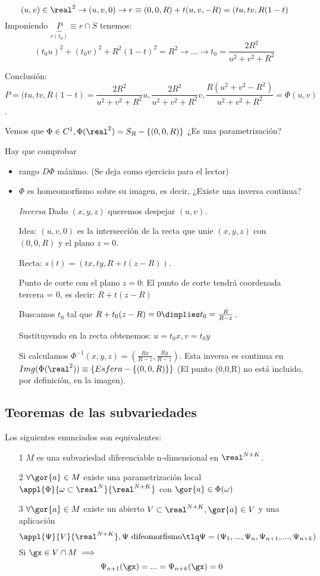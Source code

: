  \[(u,v) \in \real^2 \rightarrow (u,v,0) \rightarrow r\equiv (0,0,R) + t(u,v,-R) = (tu,tv,R(1-t)\]
 Imponiendo $\underbrace{P}_{r(t_0)} \equiv r\cap S$ tenemos: \[(t_0u)^2+(t_0v)^2 + R^2(1-t)^2 = R^2 \rightarrow ... \rightarrow t_0 = \frac{2R^2}{u^2+v^2+R^2}\]
 
 Conclusión: \[P = (tu,tv,R(1-t) = \frac{2R^2}{u^2+v^2+R^2}u,\frac{2R^2}{u^2+v^2+R^2}v,\frac{R(u^2+v^2-R^2)}{u^2+v^2+R^2} = \Phi(u,v)\].
 
 Vemos que $\Phi\in C^1, \Phi(\real^2) = S_R-\{(0,0,R)\}$ ¿Es una parametrización?
 
 Hay que comprobar \begin{itemize}
 \item rango $D\Phi$ máximo. (Se deja como ejercicio para el lector)
 \item $\Phi$ es homeomorfismo sobre su imagen, es decir, ¿Existe una inversa continua? 
 
 \emph{Inversa}
 Dado $(x,y,z)$ queremos despejar $(u,v)$.
 
 Idea: $(u,v,0)$ es la intersección de la recta que unie $(x,y,z)$ con $(0,0,R)$ y el plano $z=0$.
 
 Recta: $s(t) = (tx,ty,R+t(z-R))$.
 
 Punto de corte con el plano $z=0$: El punto de corte tendrá coordenada tercera = 0, es decir: 
 $R+t(z-R)$
 
 Buscamos $t_0$ tal que $R+t_0(z-R)=0 \dimplies t_0=\frac{R}{R-z}$.
 
 Sustituyendo en la recta obtenemos: $u = t_0x, v=t_0y$
 
 Si calculamos $\Phi^{-1}(x,y,z) = \left(\frac{Rx}{R-z},\frac{Ry}{R-z}\right)$. Esta inversa es continua en $Img(\Phi(\real^2)) \equiv \{Esfera - \{(0,0,R)\}\}$  (El punto (0,0,R) no está incluido, por definición, en la imagen).
 
 \end{itemize}
\subsection{Teoremas de las subvariedades}
\begin{theorem}\label{thmSubvariedades}
Los siguientes enunciados son equivalentes:
\begin{itemize}
\item[1] $M$ es una subvariedad diferenciable n-dimensional en $\real^{N+K}$. \label{eq_1}
\item[2] $\forall \gor{a} \in M $ existe una parametrización local $\appl{\Phi}{\omega\subset \real^N}{\real^{N+K}}$ con $\gor{a}\in \Phi(\omega)$\label{eq_2}
\item[3] $\forall \gor{a} \in M$ existe un abierto $V\subset \real^{N+K}, \gor{a}\in V$ y una aplicación 
\label{eq_3}
\[\appl{\Psi}{V}{\real^{N+K}}, \Psi\ \text{difeomorfismo} \tlq \Psi = (\Psi_1,...,\Psi_n,\Psi_{n+1},...,\Psi_{n+k})\]
Si $\gx \in V\cap M \implies$
\[\Psi_{n+1}(\gx) = ... = \Psi_{n+k}(\gx) = 0\]
\end{itemize}
\end{theorem}
 
